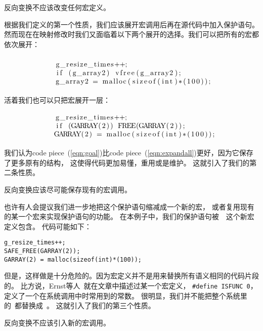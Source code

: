 \begin{decision}
反向变换不应该改变任何宏定义。
\end{decision}

根据我们定义的第一个性质，我们应该展开宏调用后再在源代码中加入保护语句。
然而现在在映射修改时我们又面临着以下两个展开的选择。我们可以把所有的宏都依次展开：

\begin{equation}
\begin{minipage}{7.6cm}
\begin{lstlisting}
g_resize_times++;
if (g_array2) vfree(g_array2);
g_array2 = malloc(sizeof(int)*(100));
\end{lstlisting}
\end{minipage}
\label{eqn:expandall}
\end{equation}
活着我们也可以只把宏展开一层：
\begin{equation}
\begin{minipage}{7.6cm}
\begin{lstlisting}
g_resize_times++;
if (GARRAY(2)) FREE(GARRAY(2));
GARRAY(2) = malloc(sizeof(int)*(100));
\end{lstlisting}
\end{minipage}
\label{eqn:goal}
\end{equation}
\newcommand{\coderef}[1]{code piece~(\ref{#1})}
我们认为\coderef{eqn:goal}比\coderef{eqn:expandall}更好，因为它保存了更多原有的结构，
这使得代码更加易懂，重用或是维护。
这就引入了我们的第二条性质。

\begin{decision}
反向变换应该尽可能保存现有的宏调用。
\end{decision}

也许有人会提议我们进一步地把这个保护语句缩减成一个新的宏，
或者复用现有的某一个宏来实现保护语句的功能。
在本例子中，我们的保护语句被~~这个新宏定义包含。
代码可能如下：
\begin{lstlisting}
g_resize_times++;
SAFE_FREE(GARRAY(2));
GARRAY(2) = malloc(sizeof(int)*(100));
\end{lstlisting}
但是，这样做是十分危险的。因为宏定义并不是用来替换所有语义相同的代码片段的。
比方说，Ernst等人~\parencite{ernst2002empirical}就在文章中描述过某一个宏定义，
\lstinline!#define ISFUNC 0!， 定义了一个在系统调用中时常用到的常数。
很明显，我们并不能把整个系统里的~都替换成~。
这就引入了我们的第三个性质。

\begin{decision}
  反向变换不应该引入新的宏调用。
\end{decision}

